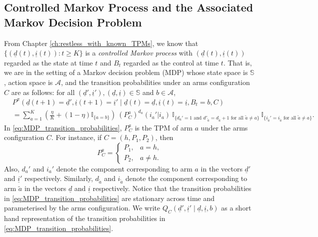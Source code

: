 \subsection{Controlled Markov Process and the Associated Markov Decision Problem}
From Chapter \ref{ch:restless_with_known_TPMs}, we know that $\{(\underline{d}(t), \underline{i}(t)):t\geq K\}$ is a {\em controlled Markov process} with $(\underline{d}(t), \underline{i}(t))$ regarded as the state at time $t$ and $B_t$ regarded as the control at time $t$. That is, we are in the setting of a Markov decision problem (MDP) whose state space is $\mathbb{S}$, action space is $\mathcal{A}$, and the transition probabilities under an arms configuration $C$ are as follows: for all $(\underline{d}', \underline{i}'), (\underline{d}, \underline{i})\in \mathbb{S}$ and $b\in \mathcal{A}$,
{\color{black} \begin{align}
	&P^\pi(\underline{d}(t+1)=\underline{d}',\underline{i}(t+1)=\underline{i}'\mid \underline{d}(t)=\underline{d},\underline{i}(t)=\underline{i}, B_t=b, C)\nonumber\\
	&=\sum\limits_{a=1}^{K}\left(\frac{\eta}{K}+(1-\eta)\mathbb{I}_{\{a=b\}}\right)~(P_C^a)^{d_a}(i_a'|i_a)~\mathbb{I}_{\{d_a'=1\text{ and }d'_{\tilde{a}}=d_{\tilde{a}}+1\text{ for all }\tilde{a}\neq a\}}~\mathbb{I}_{\{i_{\tilde{a}}'=i_{\tilde{a}}\text{ for all }\tilde{a}\neq a\}}.
	\label{eq:MDP_transition_probabilities}
\end{align}}
In \eqref{eq:MDP_transition_probabilities}, $P_C^a$ is the TPM of arm $a$ under the arms configuration $C$. For instance, if $C=(h, P_1, P_2)$, then
\begin{equation}
P_C^a=\begin{cases}
P_1, & a=h, \\
P_2, & a\neq h.
\end{cases}
\label{eq:P_C^a}
\end{equation}
Also, $d_a'$ and $i_a'$ denote the component corresponding to arm $a$ in the vectors $\underline{d}'$ and $\underline{i}'$ respectively.  Similarly, $d_{\tilde{a}}$ and $i_{\tilde{a}}$ denote the component corresponding to arm $\tilde{a}$ in the vectors $\underline{d}$ and $\underline{i}$ respectively. Notice that the transition probabilities in \eqref{eq:MDP_transition_probabilities} are stationary across time and parameterised by the arms configuration. We write $Q_C(\underline{d}', \underline{i}'\mid \underline{d}, \underline{i}, b)$ as a short hand representation of the transition probabilities in \eqref{eq:MDP_transition_probabilities}. 

